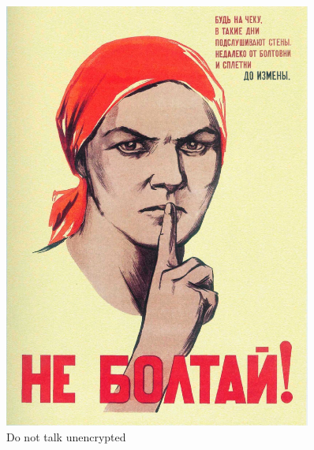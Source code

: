 \begin{figure}[H]
  \centering
  \includegraphics[width=0.9\textwidth]{neboltai.png}
  \caption*{Do not talk unencrypted}
  \label{fig:neboltai}
\end{figure}
